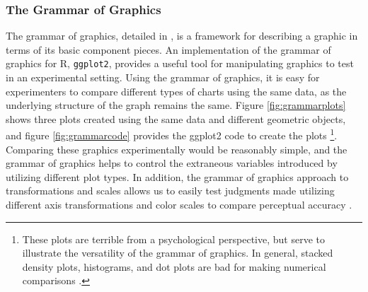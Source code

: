 \documentclass[11pt]{isuthesis}\usepackage[]{graphicx}\usepackage[]{color}
\begin{document}
\subsubsection{The Grammar of Graphics}
The grammar of graphics, detailed in \citet{wilkinson2006grammar}, is a framework for describing a graphic in terms of its basic component pieces. An implementation of the grammar of graphics for R, \texttt{ggplot2}\citep{ggplot2, wickham2010layered}, provides a useful tool for manipulating graphics to test in an experimental setting. Using the grammar of graphics, it is easy for experimenters to compare different types of charts using the same data, as the underlying structure of the graph remains the same. Figure \ref{fig:grammarplots} shows three plots created using the same data and different geometric objects, and figure \ref{fig:grammarcode} provides the ggplot2 code to create the plots \footnote{These plots are terrible from a psychological perspective, but serve to illustrate the versatility of the grammar of graphics. In general, stacked density plots, histograms, and dot plots are bad for making numerical comparisons \citep{cleveland:1985}.}. Comparing these graphics experimentally would be reasonably simple, and the grammar of graphics helps to control the extraneous variables introduced by utilizing different plot types. In addition, the grammar of graphics approach to transformations and scales allows us to easily test judgments made utilizing different axis transformations and color scales to compare perceptual accuracy \citep{hofmann2012graphical}. 
\end{document}

